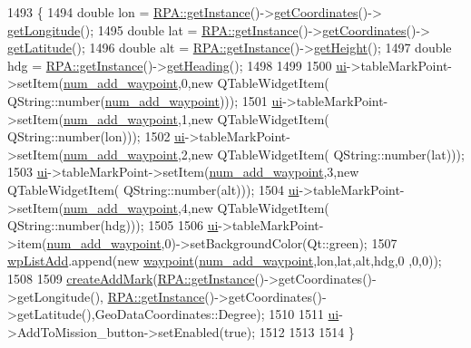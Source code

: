 \begin{DoxyCode}
1493 \{
1494     \textcolor{keywordtype}{double} lon = \hyperlink{a00012_a40277d38c94caf6125045994ba06f18f}{RPA::getInstance}()->\hyperlink{a00012_a8aaef3ba118d70f729ec23dee71755a7}{getCoordinates}()->
      \hyperlink{a00006_aeca2669cb6715159606e844ab6a77bbf}{getLongitude}();
1495     \textcolor{keywordtype}{double} lat = \hyperlink{a00012_a40277d38c94caf6125045994ba06f18f}{RPA::getInstance}()->\hyperlink{a00012_a8aaef3ba118d70f729ec23dee71755a7}{getCoordinates}()->
      \hyperlink{a00006_a555fe9c52a678f22d66b31358566cfe9}{getLatitude}();
1496     \textcolor{keywordtype}{double} alt = \hyperlink{a00012_a40277d38c94caf6125045994ba06f18f}{RPA::getInstance}()->\hyperlink{a00012_ae1d662c26106ff9692252346d578e8fa}{getHeight}();
1497     \textcolor{keywordtype}{double} hdg = \hyperlink{a00012_a40277d38c94caf6125045994ba06f18f}{RPA::getInstance}()->\hyperlink{a00012_a8c56441519ab3fa6a971bc898106adc4}{getHeading}();
1498 
1499 
1500           \hyperlink{a00008_a6dc041ef6a2ffb329928d2913e8344e6}{ui}->tableMarkPoint->setItem(\hyperlink{a00008_a0a7415ab9ef5e631521f52e9488a57bb}{num\_add\_waypoint},0,\textcolor{keyword}{new} QTableWidgetItem(
      QString::number(\hyperlink{a00008_a0a7415ab9ef5e631521f52e9488a57bb}{num\_add\_waypoint})));
1501           \hyperlink{a00008_a6dc041ef6a2ffb329928d2913e8344e6}{ui}->tableMarkPoint->setItem(\hyperlink{a00008_a0a7415ab9ef5e631521f52e9488a57bb}{num\_add\_waypoint},1,\textcolor{keyword}{new} QTableWidgetItem(
      QString::number(lon)));
1502           \hyperlink{a00008_a6dc041ef6a2ffb329928d2913e8344e6}{ui}->tableMarkPoint->setItem(\hyperlink{a00008_a0a7415ab9ef5e631521f52e9488a57bb}{num\_add\_waypoint},2,\textcolor{keyword}{new} QTableWidgetItem(
      QString::number(lat)));
1503           \hyperlink{a00008_a6dc041ef6a2ffb329928d2913e8344e6}{ui}->tableMarkPoint->setItem(\hyperlink{a00008_a0a7415ab9ef5e631521f52e9488a57bb}{num\_add\_waypoint},3,\textcolor{keyword}{new} QTableWidgetItem(
      QString::number(alt)));
1504           \hyperlink{a00008_a6dc041ef6a2ffb329928d2913e8344e6}{ui}->tableMarkPoint->setItem(\hyperlink{a00008_a0a7415ab9ef5e631521f52e9488a57bb}{num\_add\_waypoint},4,\textcolor{keyword}{new} QTableWidgetItem(
      QString::number(hdg)));
1505 
1506           \hyperlink{a00008_a6dc041ef6a2ffb329928d2913e8344e6}{ui}->tableMarkPoint->item(\hyperlink{a00008_a0a7415ab9ef5e631521f52e9488a57bb}{num\_add\_waypoint},0)->setBackgroundColor(Qt::green);
1507           \hyperlink{a00008_a98ca93f10581619f71df8f495b465cde}{wpListAdd}.append(\textcolor{keyword}{new} \hyperlink{a00016}{waypoint}(\hyperlink{a00008_a0a7415ab9ef5e631521f52e9488a57bb}{num\_add\_waypoint},lon,lat,alt,hdg,0
      ,0,0));
1508 
1509           \hyperlink{a00008_a30cffb4d3df6db10fe0b7257fec5ad49}{createAddMark}(\hyperlink{a00012_a40277d38c94caf6125045994ba06f18f}{RPA::getInstance}()->getCoordinates()->getLongitude(),
      \hyperlink{a00012_a40277d38c94caf6125045994ba06f18f}{RPA::getInstance}()->getCoordinates()->getLatitude(),GeoDataCoordinates::Degree);
1510 
1511           \hyperlink{a00008_a6dc041ef6a2ffb329928d2913e8344e6}{ui}->AddToMission\_button->setEnabled(\textcolor{keyword}{true});
1512 
1513 
1514 \}
\end{DoxyCode}
